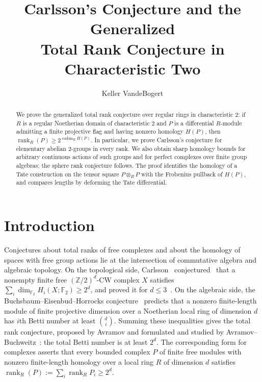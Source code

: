 \documentclass[11pt,reqno]{amsart}
\title[Carlsson's conjecture and generalized total ranks]
      {Carlsson's Conjecture and the Generalized\\ Total Rank Conjecture in Characteristic Two}
\author{Keller VandeBogert}
\date{}
\theoremstyle{plain}
\theoremstyle{definition}
\DeclareMathOperator{\rank}{rank}
\DeclareMathOperator{\codim}{codim}
\newcommand{\Ff}{\mathbb{F}}
\newcommand{\Z}{\mathbb{Z}}
\begin{document}
\begin{abstract}
We prove the generalized total rank conjecture over regular rings in characteristic $2$: if $R$ is
 a regular Noetherian
 domain of characteristic $2$ and $P$ is a differential $R$-module admitting a finite projective
 flag and having nonzero homology $H(P)$, then $\rank_R(P)\ge2^{\codim_RH(P)}$.  In particular, we
 prove Carlsson's conjecture for elementary abelian $2$-groups in every rank.  We also
 obtain sharp homology bounds for arbitrary continuous actions of such groups and for perfect complexes
 over finite group algebras; the sphere rank conjecture follows.  The proof identifies the homology
 of a Tate construction on the tensor square $P\otimes_RP$ with the Frobenius pullback of $H(P)$,
 and compares lengths by deforming the Tate
 differential.
\end{abstract}

\maketitle

\section{Introduction}\label{sec:intro}

Conjectures about total ranks of free complexes and about the homology of spaces with free group
actions lie at the intersection of commutative algebra and algebraic topology.  On the topological
side, Carlsson~\cite{CarlssonHomology} conjectured~\cite[Conjecture~I.3]{Carlsson} that a
nonempty finite free $(\Z/2)^d$-CW complex $X$
satisfies $\sum_i\dim_{\Ff_2}H_i(X;\Ff_2)\ge 2^d$, and proved it for
$d\le3$~\cite[Theorem~2]{CarlssonStudies}.  On the algebraic side, the Buchsbaum--Eisenbud--Horrocks
conjecture~\cite{BuchsbaumEisenbud,Hartshorne} predicts that a nonzero finite-length module of finite
projective dimension over a Noetherian local ring of dimension $d$ has $i$th Betti number at least
$\binom{d}{i}$.  Summing these inequalities gives the total rank conjecture, proposed by Avramov and
formulated and studied by Avramov--Buchweitz~\cite{AvramovBuchweitz}: the total Betti number is at
least $2^d$.  The corresponding
form for complexes asserts that every bounded complex $P$ of finite free modules with nonzero
finite-length homology over a local ring $R$ of dimension $d$ satisfies
$\rank_R(P):=\sum_i\rank_R P_i\ge 2^d$.
\end{document}
